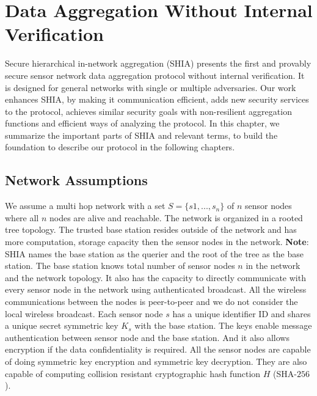 \chapter{Data Aggregation Without Internal Verification} %
	\label{cha:Data Aggregation Without Internal Verification}

	Secure hierarchical in-network aggregation (SHIA) \cite{chan2006secure} presents the first and provably secure sensor network data aggregation protocol without internal verification.
	It is designed for general networks with single or multiple adversaries.
	Our work enhances SHIA, by making it communication efficient, adds new security services to the protocol, achieves similar security goals with non-resilient aggregation functions and efficient ways of analyzing the protocol.
	In this chapter, we summarize the important parts of SHIA and relevant terms, to build the foundation to describe our protocol in the following chapters.

\section{Network Assumptions}
	We assume a multi hop network with a set $ S = \{s1,...,s_{n}\} $ of $n$ sensor nodes where all $n$ nodes are alive and reachable. 
	The network is organized in a rooted tree topology.
	The trusted base station resides outside of the network and has more computation, storage capacity then the sensor nodes in the network. 
	\textbf{Note}: SHIA names the base station as the querier and the root of the tree as the base station. 
	The base station knows total number of sensor nodes $n$ in the network and the network topology. 
	It also has the capacity to directly communicate with every sensor node in the network using authenticated broadcast.
	All the wireless communications between the nodes is peer-to-peer and we do not consider the local wireless broadcast.
	Each sensor node $s$ has a unique identifier ID and shares a unique secret symmetric key $K_{s}$ with the base station.
	The keys enable message authentication between sensor node and the base station.
	And it also allows encryption if the data confidentiality is required.
	All the sensor nodes are capable of doing symmetric key encryption and symmetric key decryption.
	They are also capable of computing collision resistant cryptographic hash function $H$ (SHA-$256$)\cite{SHA256}. 

